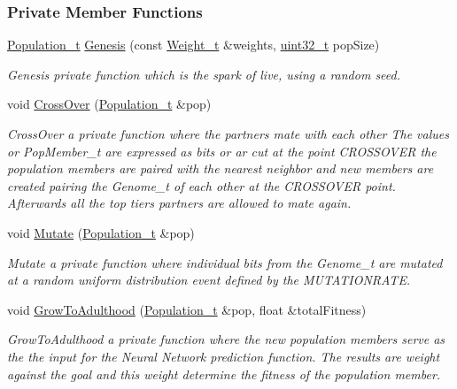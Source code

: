 \subsubsection*{Private Member Functions}
\begin{DoxyCompactItemize}
\item 
\hyperlink{_soil_math_types_8h_a8d2d4c736cf817d048a2d66dec8b12ec}{Population\+\_\+t} \hyperlink{class_soil_math_1_1_g_a_a141afd2573d2323f67915e6cea4f1a9f}{Genesis} (const \hyperlink{_soil_math_types_8h_ac56ad2b88186620fd0de0d213aa715dd}{Weight\+\_\+t} \&weights, \hyperlink{_soil_math_types_8h_a435d1572bf3f880d55459d9805097f62}{uint32\+\_\+t} pop\+Size)
\begin{DoxyCompactList}\small\item\em Genesis private function which is the spark of live, using a random seed. \end{DoxyCompactList}\item 
void \hyperlink{class_soil_math_1_1_g_a_abf408d603b2afb188a6d265eb6309b69}{Cross\+Over} (\hyperlink{_soil_math_types_8h_a8d2d4c736cf817d048a2d66dec8b12ec}{Population\+\_\+t} \&pop)
\begin{DoxyCompactList}\small\item\em Cross\+Over a private function where the partners mate with each other The values or Pop\+Member\+\_\+t are expressed as bits or ar cut at the point C\+R\+O\+S\+S\+O\+V\+E\+R the population members are paired with the nearest neighbor and new members are created pairing the Genome\+\_\+t of each other at the C\+R\+O\+S\+S\+O\+V\+E\+R point. Afterwards all the top tiers partners are allowed to mate again. \end{DoxyCompactList}\item 
void \hyperlink{class_soil_math_1_1_g_a_a489f2afd54086c14f45b654aeec0fe3c}{Mutate} (\hyperlink{_soil_math_types_8h_a8d2d4c736cf817d048a2d66dec8b12ec}{Population\+\_\+t} \&pop)
\begin{DoxyCompactList}\small\item\em Mutate a private function where individual bits from the Genome\+\_\+t are mutated at a random uniform distribution event defined by the M\+U\+T\+A\+T\+I\+O\+N\+R\+A\+T\+E. \end{DoxyCompactList}\item 
void \hyperlink{class_soil_math_1_1_g_a_a7b84b10bfb6069fe44bbd137e3a9dbb0}{Grow\+To\+Adulthood} (\hyperlink{_soil_math_types_8h_a8d2d4c736cf817d048a2d66dec8b12ec}{Population\+\_\+t} \&pop, float \&total\+Fitness)
\begin{DoxyCompactList}\small\item\em Grow\+To\+Adulthood a private function where the new population members serve as the the input for the Neural Network prediction function. The results are weight against the goal and this weight determine the fitness of the population member. \end{DoxyCompactList}\item 

\end{DoxyCompactItemize}
